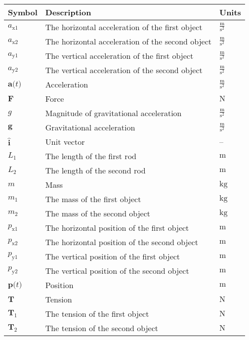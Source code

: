 \documentclass[12pt]{article}
\begin{document}
\begin{longtable}{l l l}
\toprule
\textbf{Symbol} & \textbf{Description} & \textbf{Units}
\\
\midrule
\endhead
${a_{\text{x}1}}$ & The horizontal acceleration of the first object & $\frac{\text{m}}{\text{s}^{2}}$
\\
${a_{\text{x}2}}$ & The horizontal acceleration of the second object & $\frac{\text{m}}{\text{s}^{2}}$
\\
${a_{\text{y}1}}$ & The vertical acceleration of the first object & $\frac{\text{m}}{\text{s}^{2}}$
\\
${a_{\text{y}2}}$ & The vertical acceleration of the second object & $\frac{\text{m}}{\text{s}^{2}}$
\\
$\symbf{a}\text{(}t\text{)}$ & Acceleration & $\frac{\text{m}}{\text{s}^{2}}$
\\
$\symbf{F}$ & Force & ${\text{N}}$
\\
$g$ & Magnitude of gravitational acceleration & $\frac{\text{m}}{\text{s}^{2}}$
\\
$\symbf{g}$ & Gravitational acceleration & $\frac{\text{m}}{\text{s}^{2}}$
\\
$\symbf{\hat{i}}$ & Unit vector & --
\\
${L_{1}}$ & The length of the first rod & ${\text{m}}$
\\
${L_{2}}$ & The length of the second rod & ${\text{m}}$
\\
$m$ & Mass & ${\text{kg}}$
\\
${m_{1}}$ & The mass of the first object & ${\text{kg}}$
\\
${m_{2}}$ & The mass of the second object & ${\text{kg}}$
\\
${p_{\text{x}1}}$ & The horizontal position of the first object & ${\text{m}}$
\\
${p_{\text{x}2}}$ & The horizontal position of the second object & ${\text{m}}$
\\
${p_{\text{y}1}}$ & The vertical position of the first object & ${\text{m}}$
\\
${p_{\text{y}2}}$ & The vertical position of the second object & ${\text{m}}$
\\
$\symbf{p}\text{(}t\text{)}$ & Position & ${\text{m}}$
\\
$\symbf{T}$ & Tension & ${\text{N}}$
\\
${\symbf{T}_{1}}$ & The tension of the first object & ${\text{N}}$
\\
${\symbf{T}_{2}}$ & The tension of the second object & ${\text{N}}$
\\

\end{longtable}
\end{document}
